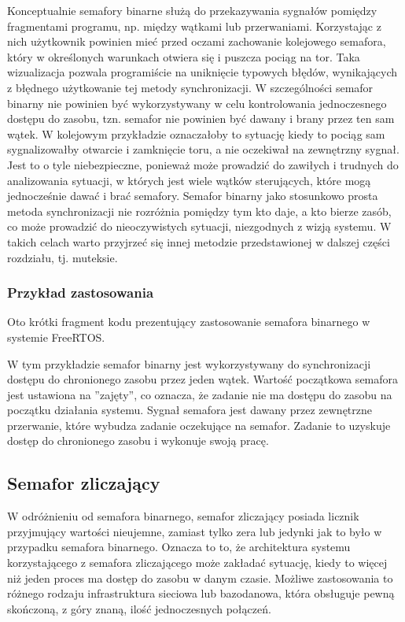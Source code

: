 Konceptualnie semafory binarne służą do przekazywania sygnałów pomiędzy fragmentami programu, np. między wątkami lub przerwaniami.
Korzystając z nich użytkownik powinien mieć przed oczami zachowanie kolejowego semafora, który w określonych warunkach otwiera się
i puszcza pociąg na tor. Taka wizualizacja pozwala programiście na uniknięcie typowych błędów, wynikających z błędnego użytkowanie tej metody synchronizacji.
W szczególności semafor binarny nie powinien być wykorzystywany w celu kontrolowania jednoczesnego dostępu do zasobu,
tzn. semafor nie powinien być dawany i brany przez ten sam wątek\cite{shaw1991real}. W kolejowym przykładzie oznaczałoby to sytuację kiedy to pociąg sam sygnalizowałby
otwarcie i zamknięcie toru, a nie oczekiwał na zewnętrzny sygnał. Jest to o tyle niebezpieczne, ponieważ może prowadzić do zawiłych i trudnych
do analizowania sytuacji, w których jest wiele wątków sterujących, które mogą jednocześnie dawać i brać semafory. Semafor binarny jako stosunkowo
prosta metoda synchronizacji nie rozróżnia pomiędzy tym kto daje, a kto bierze zasób, co może prowadzić do nieoczywistych sytuacji, niezgodnych z wizją
systemu. W takich celach warto przyjrzeć się innej metodzie przedstawionej w dalszej części rozdziału, tj. muteksie.

\subsubsection{Przykład zastosowania}
Oto krótki fragment kodu prezentujący zastosowanie semafora binarnego w systemie FreeRTOS.

W tym przykładzie semafor binarny jest wykorzystywany do synchronizacji dostępu do chronionego zasobu przez jeden wątek.
Wartość początkowa semafora jest ustawiona na ''zajęty'', co oznacza, że zadanie nie ma dostępu do zasobu na początku
działania systemu. Sygnał semafora jest dawany przez zewnętrzne przerwanie, które wybudza zadanie oczekujące na semafor.
Zadanie to uzyskuje dostęp do chronionego zasobu i wykonuje swoją pracę.

\subsection{Semafor zliczający}
W odróżnieniu od semafora binarnego, semafor zliczający posiada licznik przyjmujący wartości nieujemne, zamiast tylko zera lub jedynki
jak to było w przypadku semafora binarnego\cite{freertosbook}.
Oznacza to to, że architektura systemu korzystającego z semafora zliczającego może zakładać sytuację, kiedy to więcej niż jeden proces
ma dostęp do zasobu w danym czasie. Możliwe zastosowania to różnego rodzaju infrastruktura sieciowa lub bazodanowa,
która obsługuje pewną skończoną, z góry znaną, ilość jednoczesnych połączeń.

